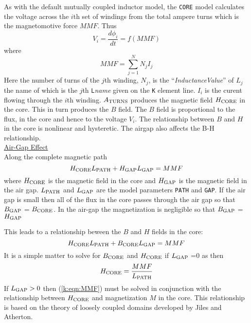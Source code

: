 As with the default mutually coupled inductor model, the {\tt CORE}
model calculates the voltage across the $i$th set of windings from
the total ampere turns which is the magnetomotive force $MMF$.
Thus
\begin{equation}
V_i = {\frac{\textstyle d \phi_i }{\textstyle d t}} = f( MMF )
\end{equation}
where
\begin{equation}
MMF = \sum_{j=1}^N N_j I_j
\end{equation}
Here the number of turns of the $j$th winding, $N_j$, is
the ``{\it InductanceValue}'' of $L_j$ the name of which is the $j$th
{\tt L}{\it name} given on the {\tt K} element
line. $I_i$ is the curent flowing through the $i$th winding.
$A_{\mbox{\scriptsize TURNS}}$ produces the magnetic field $H_{\mbox{\scriptsize CORE}}$ in the core.
This in turn produces the $B$ field.
The $B$ field is
proportional to the flux, in the core and hence to the voltage $V_i$.
The relationship between $B$ and $H$ in the core is nonlinear
and hysteretic. The airgap also affects the B-H relationship.\\[0.1in]
\noindent\underline{Air-Gap Effect}\\[0.1in]
Along the complete magnetic path
\begin{equation}
H_{\mbox{\scriptsize CORE}} L_{\mbox{\scriptsize PATH}} + H_{\mbox{\scriptsize GAP}} L_{\mbox{\scriptsize GAP}} = MMF
\end{equation}
where $H_{\mbox{\scriptsize CORE}}$ is the magnetic field in the core and
$H_{\mbox{\scriptsize GAP}}$ is the magnetic field in the air gap.
$L_{\mbox{\scriptsize PATH}}$ and $L_{\mbox{\scriptsize GAP}}$ are the model parameters {\tt PATH} and
{\tt GAP}.
If the air gap is small then  all of the flux in the core passes through the
air gap so that $B_{\mbox{\scriptsize GAP}}$ = $B_{\mbox{\scriptsize CORE}}$.
In the air-gap the magnetization is negligible so that
$B_{\mbox{\scriptsize GAP}}$ = $H_{\mbox{\scriptsize GAP}}$

This leads to a relationship beween the $B$ and $H$ fields in the core:
\begin{equation}
H_{\mbox{\scriptsize CORE}} L_{\mbox{\scriptsize PATH}} + B_{\mbox{\scriptsize CORE}} L_{\mbox{\scriptsize GAP}} = MMF
\label{k:eqn:MMF}
\end{equation}
It is a simple matter to solve for $B_{\mbox{\scriptsize CORE}}$ and $H_{\mbox{\scriptsize CORE}}$
if $L_{\mbox{\scriptsize GAP}}$ =0 as then
\begin{equation}
H_{\mbox{\scriptsize CORE}} = {\frac{MMF}{L_{\mbox{\scriptsize PATH}}}}
\end{equation}
If $L_{\mbox{\scriptsize GAP}} > 0$ then (\ref{k:eqn:MMF})
must be solved in conjunction with the relationship between
$H_{\mbox{\scriptsize CORE}}$ and magnetization $M$ in the core.
This relationship is based on the theory of loosely coupled domains
developed by Jiles and Atherton.

